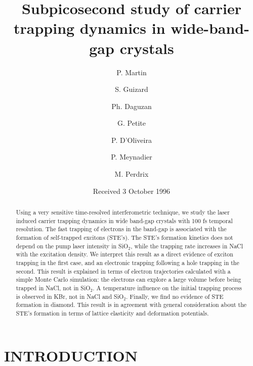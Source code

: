 \documentclass[aps,prb,reprint]{revtex4-2}
\begin{document}
\title{Subpicosecond study of carrier trapping dynamics in wide-band-gap crystals}

\author{P. Martin}
\author{S. Guizard}
\author{Ph. Daguzan}
\author{G. Petite}

\author{P. D'Oliveira}
\author{P. Meynadier}
\author{M. Perdrix}

\date{Received 3 October 1996}

\begin{abstract}
Using a very sensitive time-resolved interferometric technique, we study the laser induced carrier trapping dynamics in wide band-gap crystals with 100 fs temporal resolution. The fast trapping of electrons in the band-gap is associated with the formation of self-trapped excitons (STE's). The STE's formation kinetics does not depend on the pump laser intensity in SiO$_2$, while the trapping rate increases in NaCl with the excitation density. We interpret this result as a direct evidence of exciton trapping in the first case, and an electronic trapping following a hole trapping in the second. This result is explained in terms of electron trajectories calculated with a simple Monte Carlo simulation: the electrons can explore a large volume before being trapped in NaCl, not in SiO$_2$. A temperature influence on the initial trapping process is observed in KBr, not in NaCl and SiO$_2$. Finally, we find no evidence of STE formation in diamond. This result is in agreement with general consideration about the STE's formation in terms of lattice elasticity and deformation potentials.
\end{abstract}

\maketitle

\section{INTRODUCTION}
\end{document}
